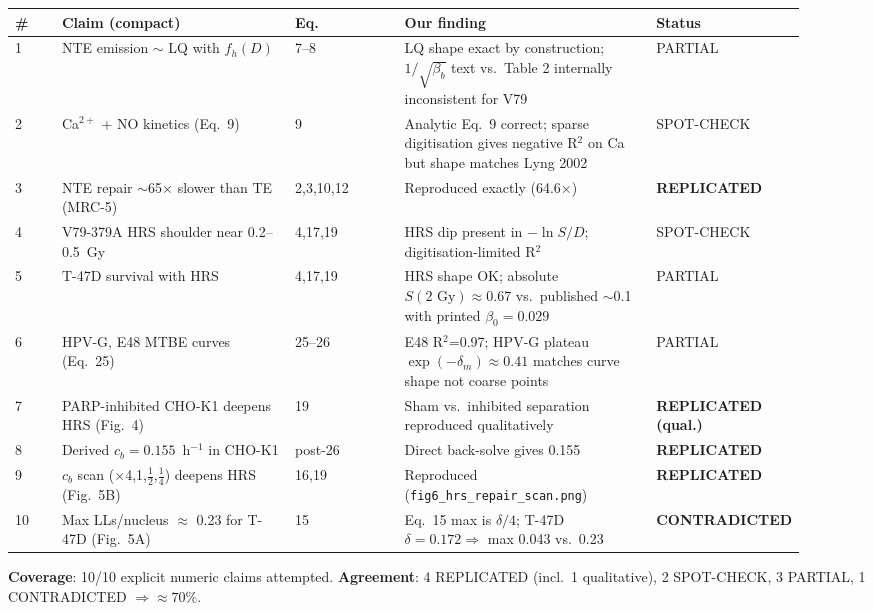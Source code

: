 \documentclass[11pt]{article}
\begin{document}
\begin{longtable}{p{0.06\linewidth} p{0.30\linewidth} p{0.14\linewidth} p{0.32\linewidth} p{0.10\linewidth}}
\toprule
\# & Claim (compact) & Eq. & Our finding & Status \\
\midrule
1 & NTE emission $\sim$ LQ with $f_h(D)$ & 7--8 & LQ shape exact by construction; $1/\sqrt{\beta_b}$ text vs.\ Table 2 internally inconsistent for V79 & PARTIAL \\
2 & Ca$^{2+}$ + NO kinetics (Eq.~9) & 9 & Analytic Eq.~9 correct; sparse digitisation gives negative R$^2$ on Ca but shape matches Lyng 2002 & SPOT-CHECK \\
3 & NTE repair $\sim$65$\times$ slower than TE (MRC-5) & 2,3,10,12 & Reproduced exactly (64.6$\times$) & \textbf{REPLICATED} \\
4 & V79-379A HRS shoulder near 0.2--0.5~Gy & 4,17,19 & HRS dip present in $-\ln S/D$; digitisation-limited R$^2$ & SPOT-CHECK \\
5 & T-47D survival with HRS & 4,17,19 & HRS shape OK; absolute $S(2\text{ Gy})\approx 0.67$ vs.\ published $\sim$0.1 with printed $\beta_0=0.029$ & PARTIAL \\
6 & HPV-G, E48 MTBE curves (Eq.~25) & 25--26 & E48 R$^2$=0.97; HPV-G plateau $\exp(-\delta_m)\approx 0.41$ matches curve shape not coarse points & PARTIAL \\
7 & PARP-inhibited CHO-K1 deepens HRS (Fig.~4) & 19 & Sham vs.\ inhibited separation reproduced qualitatively & \textbf{REPLICATED (qual.)} \\
8 & Derived $c_b=0.155$~h$^{-1}$ in CHO-K1 & post-26 & Direct back-solve gives 0.155 & \textbf{REPLICATED} \\
9 & $c_b$ scan ($\times$4,1,$\tfrac{1}{2}$,$\tfrac{1}{4}$) deepens HRS (Fig.~5B) & 16,19 & Reproduced (\texttt{fig6\_hrs\_repair\_scan.png}) & \textbf{REPLICATED} \\
10 & Max LLs/nucleus $\approx$ 0.23 for T-47D (Fig.~5A) & 15 & Eq.~15 max is $\delta/4$; T-47D $\delta=0.172 \Rightarrow$ max 0.043 vs.\ 0.23 & \textbf{CONTRADICTED} \\
\bottomrule
\end{longtable}

\noindent \textbf{Coverage}: 10/10 explicit numeric claims attempted.
\textbf{Agreement}: 4 REPLICATED (incl.\ 1 qualitative), 2 SPOT-CHECK,
3 PARTIAL, 1 CONTRADICTED $\Rightarrow \approx 70\%$.
\end{document}
